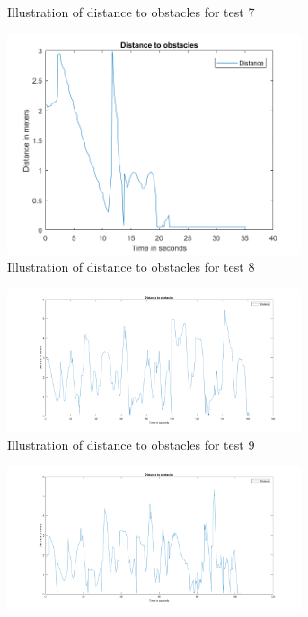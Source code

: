 \documentclass[../Head/Main.tex]{subfiles}
\begin{document}
\begin{figure}[H]
\begin{subfigure}[b]{0.49\textwidth}
    \caption{Illustration of distance to obstacles for test 7}
    \label{fig:MarbleTest7}
  \end{subfigure}
  \hfill
  \begin{subfigure}[b]{0.49\textwidth}
    \centering
    \includegraphics[width=0.95\textwidth]{../Figures/MatlabPlots/MarblesTest8}
    \caption{Illustration of distance to obstacles for test 8}
    \label{fig:MarbleTest8}
  \end{subfigure}
  \hfill
  \begin{subfigure}[b]{0.49\textwidth}
  \centering
  \includegraphics[width=0.95\textwidth]{../Figures/MatlabPlots/MarblesTest9}
    \caption{Illustration of distance to obstacles for test 9}
    \label{fig:MarbleTest9}
  \end{subfigure}
  \hfill
  \begin{subfigure}[b]{0.49\textwidth}
    \centering
    \includegraphics[width=0.95\textwidth]{../Figures/MatlabPlots/MarblesTest10}

\end{subfigure}
\end{figure}
\end{document}

